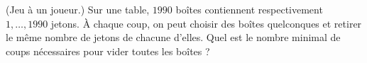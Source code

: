 (Jeu à un joueur.) Sur une table, $1990$ boîtes contiennent respectivement $1, \ldots, 1990$ jetons. À chaque coup, on peut choisir des boîtes quelconques et retirer le même nombre de jetons de chacune d'elles. Quel est le nombre minimal de coups nécessaires pour vider toutes les boîtes ?
